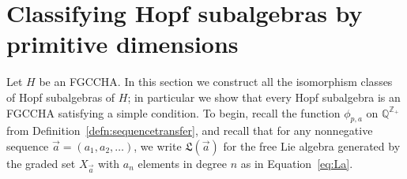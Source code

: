 \documentclass[11pt]{amsart}
\theoremstyle{definition}
\numberwithin{equation}{section}
\def\CC{{\mathbb C}}
\def\ZZ{{\mathbb Z}}
\def\QQ{{\mathbb Q}}
\newcommand{\FGCCHA}{\textsf{FGCCHA}\xspace}
\newcommand{\mike}[1]{\todo[size=\tiny,color=green!30]{#1 \\ \hfill --- Mike}}
\newcommand{\lucas}[1]{\todo[size=\tiny,color=red!50]{#1 \\ \hfill --- Lucas}}
\begin{document}
%



\section{Classifying Hopf subalgebras by primitive dimensions}
\label{sec:subalgebras}

Let $H$ be an \FGCCHA.  
In this section we construct all the isomorphism classes of Hopf subalgebras of $H$; in particular we show that every Hopf subalgebra is an \FGCCHA satisfying a simple condition.
To begin, recall the function $\phi_{p, a}$ on $\QQ^{\ZZ_+}$ from Definition~\ref{defn:sequencetransfer}, and recall that for any nonnegative sequence $\vec{a} = (a_{1}, a_{2}, \ldots)$, we write $\mathfrak{L}(\vec{a})$ for the free Lie algebra generated by the graded set $X_{\vec{a}}$ with $a_{n}$ elements in degree $n$ as in Equation~\eqref{eq:La}.
\end{document}
